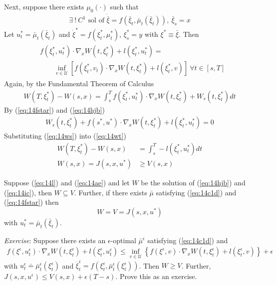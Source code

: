 Next, suppose there exists $\mu_0(\cdot)$ such that
\begin{align}
\label{eq:14c1d}
\exists~!~C^1 \text{~sol~of~} \dot{\bar{\xi}} = f(\bar{\xi}_t,\bar{\mu}_t(\bar{\xi}_t)),~\bar{\xi}_s=x
\end{align}
Let $u_t^\ast=\bar{\mu}_t(\bar{\xi}_t)$ and $\dot{\xi}^\ast = f(\xi_t^\ast,\mu_t^\ast)$, $\xi_s^\ast=y$ with $\xi^\ast\equiv\bar{\xi}$.
Then
\begin{align}
\label{eq:14fstar}
\begin{split}
&f(\xi_t^\ast,u_t^\ast)\cdot\nabla_x W(t,\xi_t^\ast) + l(\xi_t^\ast,u_t^\ast) = \\
&\qquad \inf_{v\in\mathcal{U}}\left[ f(\xi_t^\ast,v_t)\cdot\nabla_x W(t,\xi_t^\ast) + l(\xi_t^\ast,v) \right]~\forall t\in[s,T]
\end{split}
\end{align}
Again, by the Fundamental Theorem of Calculus
\begin{align}
\label{eq:14wt}
W(T,\xi_t^\ast)-W(s,x) = \int_s^T f(\xi_t^\ast,u_t^\ast)\cdot\nabla_x W(t,\xi_t^\ast)+W_s(t,\xi_t^\ast)dt
\end{align}
By (\ref{eq:14fstar}) and (\ref{eq:14hjb})
\begin{align}
\label{eq:14ws}
W_s(t,\xi_t^\ast) + f(s^\ast,u^\ast)\cdot\nabla_x W(t,\xi_t^\ast) + l(\xi_t^\ast,u_t^\ast) = 0
\end{align}
Substituting (\ref{eq:14ws}) into (\ref{eq:14wt})
\begin{align}
\label{eq:14wsx}
W(T,\xi_t^\ast) - W(s,x) &= \int_s^T -l(\xi_t^\ast,u_t^\ast)dt \nonumber \\
W(s,x) = J(s,x,u^\ast) &\geq V(s,x)
\end{align}

\begin{theorem}
Suppose (\ref{eq:14l}) and (\ref{eq:14ae}) and let $W$ be the solution of (\ref{eq:14hjb}) and (\ref{eq:14ic}), then $W\subseteq V$.
Further, if there exists $\bar{\mu}$ satisfying (\ref{eq:14c1d}) and (\ref{eq:14fstar}) then
$$W=V=J(s,x,u^\ast)$$
with $u_t^\ast = \bar{\mu}_t(\bar{\xi}_t)$.
\end{theorem}

\textit{Exercise}: Suppose there exists an $\epsilon$-optimal $\bar{\mu}^\epsilon$ satisfying (\ref{eq:14c1d}) and
\begin{align}
\label{eq:14feps}
f(\xi^\epsilon,u_t^\epsilon)\cdot\nabla_x W(t,\xi_t^\epsilon) + l(\xi_t^\epsilon,u_t^\epsilon) \leq \inf_{v\in\mathcal{U}} \left\lbrace f(\xi^\epsilon,v)\cdot\nabla_x W(t,\xi_t^\epsilon) + l(\xi_t^\epsilon,v) \right\rbrace + \epsilon
\end{align}
with $u_t^\epsilon\doteq \bar{\mu}_t^\epsilon(\xi_t^\epsilon)$ and $\dot{\xi}_t^\epsilon = f(\xi_t^\epsilon, \bar{\mu}_t^\epsilon(\xi_t^\epsilon))$.
Then $W\geq V$.
Further, $J(s,x,u^\epsilon) \leq V(s,x) + \epsilon(T-s)$.
Prove this as an exercise.

